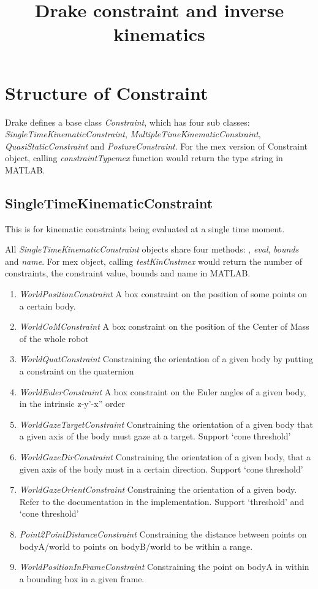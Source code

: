 \documentclass{article}
\title{Drake constraint and inverse kinematics}
\begin{document}
\maketitle
\section{Structure of Constraint}
Drake defines a base class \textsl{Constraint}, which has four sub classes: \textsl{SingleTimeKinematicConstraint}, \textsl{MultipleTimeKinematicConstraint}, \textsl{QuasiStaticConstraint} and \textsl{PostureConstraint}. For the mex version of Constraint object, calling \textsl{constraintTypemex} function would return the type string in MATLAB. 

\subsection{SingleTimeKinematicConstraint}
This is for kinematic constraints being evaluated at a single time moment.

All \textsl{SingleTimeKinematicConstraint} objects share four methods: , \textsl{eval}, \textsl{bounds} and \textsl{name}. For mex object, calling \textsl{testKinCnstmex} would return the number of constraints, the constraint value, bounds and name in MATLAB.
\begin{enumerate}
\item \textsl{WorldPositionConstraint} A box constraint on the position of some points on a certain body.
\item \textsl{WorldCoMConstraint} A box constraint on the position of the Center of Mass of the whole robot
\item \textsl{WorldQuatConstraint} Constraining the orientation of a given body by putting a constraint on the quaternion
\item \textsl{WorldEulerConstraint} A box constraint on the Euler angles of a given body, in the intrinsic z-y'-x'' order
\item \textsl{WorldGazeTargetConstraint} Constraining the orientation of a given body that a given axis of the body must gaze at a target. Support `cone threshold'
\item \textsl{WorldGazeDirConstraint} Constraining the orientation of a given body, that a given axis of the body must in a certain direction. Support `cone threshold'
\item \textsl{WorldGazeOrientConstraint} Constraining the orientation of a given body. Refer to the documentation in the implementation. Support `threshold' and `cone threshold'
\item \textsl{Point2PointDistanceConstraint} Constraining the distance between points on bodyA/world to points on bodyB/world to be within a range.
\item \textsl{WorldPositionInFrameConstraint} Constraining the point on bodyA in within a bounding box in a given frame.
\end{enumerate}
\end{document}
